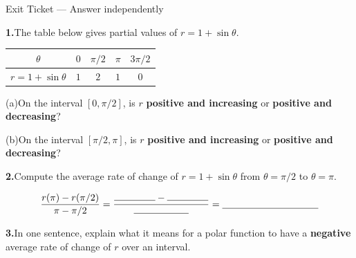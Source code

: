 \documentclass[10pt]{article}
\begin{document}
\namedateperiod

\vspace{0.12in}

\begin{notesbox}{Exit Ticket --- Answer independently}

\textbf{1.}\quad The table below gives partial values of $r = 1 + \sin\theta$.

\vspace{6pt}
\renewcommand{\arraystretch}{1.5}
\begin{tabular}{|c|c|c|c|c|}
\hline
$\theta$ & $0$ & $\pi/2$ & $\pi$ & $3\pi/2$ \\
\hline
$r = 1 + \sin\theta$ & $1$ & $2$ & $1$ & $0$ \\
\hline
\end{tabular}

\vspace{8pt}
(a)\quad On the interval $[0, \pi/2]$, is $r$ \textbf{positive and increasing}
or \textbf{positive and decreasing}?

\vspace{4pt}
\underline{\hspace{7cm}}

\vspace{8pt}
(b)\quad On the interval $[\pi/2, \pi]$, is $r$ \textbf{positive and increasing}
or \textbf{positive and decreasing}?

\vspace{4pt}
\underline{\hspace{7cm}}

\vspace{0.16in}
\textbf{2.}\quad Compute the average rate of change of $r = 1 + \sin\theta$
from $\theta = \pi/2$ to $\theta = \pi$.

\vspace{4pt}
$$\frac{r(\pi) - r(\pi/2)}{\pi - \pi/2} = \frac{\rule{1.5cm}{0.4pt} - \rule{1.5cm}{0.4pt}}{\rule{2cm}{0.4pt}} = \underline{\hspace{3.5cm}}$$

\vspace{0.16in}
\textbf{3.}\quad In one sentence, explain what it means for a polar function to have
a \textbf{negative} average rate of change of $r$ over an interval.


\end{notesbox}
\end{document}
